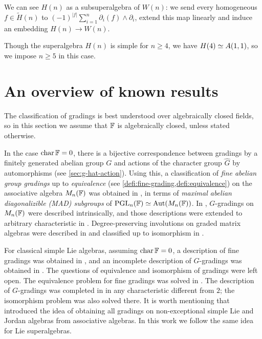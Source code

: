 We can see $H(n)$ as a subsuperalgebra of $W(n)$: we send every homogeneous ${f\in \tilde H(n)}$ to $(-1)^{|f|}\sum_{i=1}^n \partial_i(f) \wedge \partial_i$, extend this map linearly and induce an embedding $H(n) \to W(n)$. 

Though the superalgebra $H(n)$ is simple for $n\geq 4$, we have $H(4)\simeq A(1,1)$, so we impose $n\geq 5$ in this case.


\section{An overview of known results}

The classification of gradings is best understood over algebraically closed fields, so in this section we assume that $\mathbb{F}$ is algebraically closed, unless stated otherwise. 

\label{intro-equiv}

In the case $\operatorname{char} \mathbb{F} = 0$, there is a bijective correspondence between gradings by a finitely generated abelian group $G$ and actions of the character group $\widehat G$ by automorphisms (see \cref{sec:g-hat-action}). 
Using this, a classification of \emph{fine abelian group gradings} up to \emph{equivalence} (see \cref{defi:fine-grading,defi:equivalence}) on the associative algebra $M_n(\mathbb{F})$ was obtained in \cite{HPP}, in terms of \emph{maximal abelian diagonalizible (MAD) subgroups} of $\operatorname{PGL}_n(\mathbb{F}) \simeq \operatorname{Aut}( M_n(\mathbb{F}) )$. 
In \cite{BSZ01, BZ02}, $G$-gradings on $M_n(\mathbb{F})$ were described intrinsically, and those descriptions were extended to arbitrary characteristic in \cite{BZ03}.
Degree-preserving involutions on graded matrix algebras were described in \cite{BZ07, BG08a} and classified up to isomorphism in \cite{BK10}. 

For classical simple Lie algebras, 
assuming $\operatorname{char} \mathbb{F} = 0$, a description of fine gradings was obtained in \cite{HPP}, and an incomplete description of $G$-gradings was obtained in \cite{BSZ05,BZ06}. 
The questions of equivalence and isomorphism of gradings were left open. 
The equivalence problem for fine gradings was solved in \cite{Eld10}. 
The description of $G$-gradings was completed in \cite{BK10} in any characteristic different from $2$; the isomorphism problem was also solved there. 
It is worth mentioning that \cite{BSZ05} introduced the idea of obtaining all gradings on non-exceptional simple Lie and Jordan algebras from associative algebras. 
In this work we follow the same idea for Lie superalgebras. 

